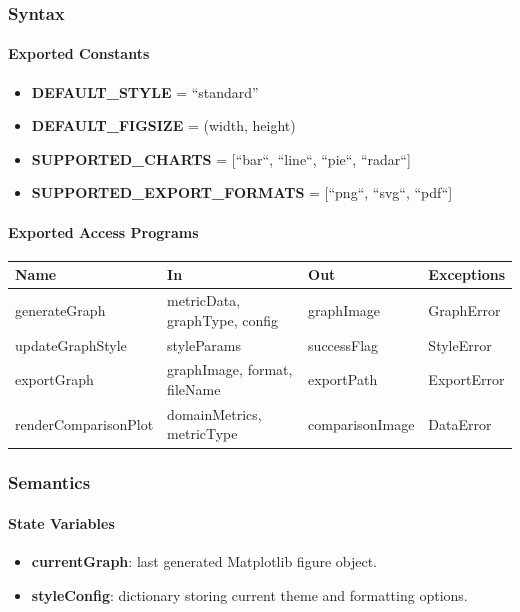 \documentclass[12pt, titlepage]{article}
\begin{document}
  \subsubsection{Syntax}

\paragraph{Exported Constants}
\begin{itemize}
  \item \textbf{DEFAULT\_STYLE} = ``standard''
  \item \textbf{DEFAULT\_FIGSIZE} = (width, height)
  \item \textbf{SUPPORTED\_CHARTS} = [``bar``, ``line``, ``pie``, ``radar``]
  \item \textbf{SUPPORTED\_EXPORT\_FORMATS} = [``png``, ``svg``, ``pdf``]
\end{itemize}

\paragraph{Exported Access Programs}
\begin{center}
\renewcommand{\arraystretch}{1.2}
\begin{tabularx}{\textwidth}{l X X l}
\toprule
\textbf{Name} & \textbf{In} & \textbf{Out} & \textbf{Exceptions}\\
\midrule
generateGraph & metricData, graphType, config & graphImage & GraphError \\
updateGraphStyle & styleParams & successFlag & StyleError \\
exportGraph & graphImage, format, fileName & exportPath & ExportError \\
renderComparisonPlot & domainMetrics, metricType & comparisonImage & DataError \\
\bottomrule
\end{tabularx}
\end{center}

\subsubsection{Semantics}

\paragraph{State Variables}
\begin{itemize}
  \item \textbf{currentGraph}: last generated Matplotlib figure object.
  \item \textbf{styleConfig}: dictionary storing current theme and formatting options.
\end{itemize}
\end{document}
